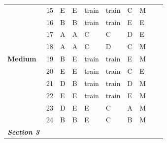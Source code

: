 \documentclass[pageno]{jpaper}
\newcommand{\textbi}[1]{\textbf{\textit{#1}}}
\begin{document}
\begin{table}[]
\begin{tabularx}{\textwidth}{XXXXXXXXXX}
\textbf{}                & 15              & E                       & E                      & train                   & train                   & C                       & M                   \\
\textbf{}                & 16              & B                       & B                      & train                   & train                   & E                       & E                   \\
\textbf{}                & 17              & A                       & A                      & C                       & C                       & D                       & E                   \\
\textbf{}                & 18              & A                       & A                      & C                       & D                       & C                       & M                   \\
\textbf{Medium}          & 19              & B                       & E                      & train                   & train                   & E                       & M                   \\
\textbf{}                & 20              & E                       & E                      & train                   & train                   & C                       & E                   \\
\textbf{}                & 21              & D                       & B                      & train                   & train                   & D                       & M                   \\
\textbf{}                & 22              & E                       & E                      & train                   & train                   & E                       & M                   \\
\textbf{}                & 23              & D                       & E                      & E                       & C                       & A                       & M                   \\
\textbf{}                & 24              & B                       & B                      & E                       & C                       & B                       & M                   \\ \midrule
\textbi{Section 3}       &                 &                         &                        &                         &                         &                         &                     \\ \midrule

\end{tabularx}
\end{table}
\end{document}
